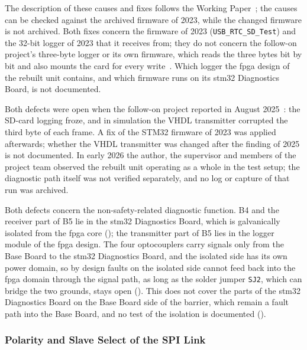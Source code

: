 \begin{description}
\end{description}

The description of these causes and fixes follows the Working Paper~\cite[Sec.~V-E]{torun2026}; the causes can be checked against the archived firmware of 2023, while the changed firmware is not archived. Both fixes concern the firmware of 2023 (\texttt{USB\_RTC\_SD\_Test}) and the 32-bit logger of 2023 that it receives from; they do not concern the follow-on project's three-byte logger or its own firmware, which reads the three bytes bit by bit and also mounts the card for every write~\cite[pp.~16--17]{savchuk2025}. Which logger the \gls{fpga} design of the rebuilt unit contains, and which firmware runs on its \gls{stm32} Diagnostics Board, is not documented.

Both defects were open when the follow-on project reported in August 2025~\cite[pp.~19, 21]{savchuk2025}: the SD-card logging froze, and in simulation the VHDL transmitter corrupted the third byte of each frame. A fix of the STM32 firmware of 2023 was applied afterwards; whether the VHDL transmitter was changed after the finding of 2025 is not documented. In early 2026 the author, the supervisor and members of the project team observed the rebuilt unit operating as a whole in the test setup; the diagnostic path itself was not verified separately, and no log or capture of that run was archived.

Both defects concern the non-safety-related diagnostic function. B4 and the receiver part of B5 lie in the \gls{stm32} Diagnostics Board, which is galvanically isolated from the \gls{fpga} core (); the transmitter part of B5 lies in the logger module of the \gls{fpga} design. The four optocouplers carry signals only from the Base Board to the \gls{stm32} Diagnostics Board, and the isolated side has its own power domain, so by design faults on the isolated side cannot feed back into the \gls{fpga} domain through the signal path, as long as the solder jumper \texttt{SJ2}, which can bridge the two grounds, stays open (). This does not cover the parts of the \gls{stm32} Diagnostics Board on the Base Board side of the barrier, which remain a fault path into the Base Board, and no test of the isolation is documented ().

\subsubsection{Polarity and Slave Select of the SPI Link}

